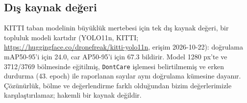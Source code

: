 \subsection{Dış kaynak değeri}\label{sec:ek-dis}
KITTI taban modelinin büyüklük mertebesi için tek dış kaynak değeri, bir topluluk modeli kartıdır (YOLO11n, KITTI; \url{https://huggingface.co/dronefreak/kitti-yolo11n}, erişim 2026-10-22): doğrulama mAP50-95'i için 24.0, car AP50-95'i için 67.3 bildirir. Model 1280 px'te ve 3712/3769 bölmesinde eğitilmiş, \texttt{DontCare} işlemesi belirtilmemiş ve erken durdurma (43. epoch) ile raporlanan sayılar aynı doğrulama kümesine dayanır. Çözünürlük, bölme ve değerlendirme farklı olduğundan bizim değerlerimizle karşılaştırılamaz; hakemli bir kaynak değildir.

\FloatBarrier
